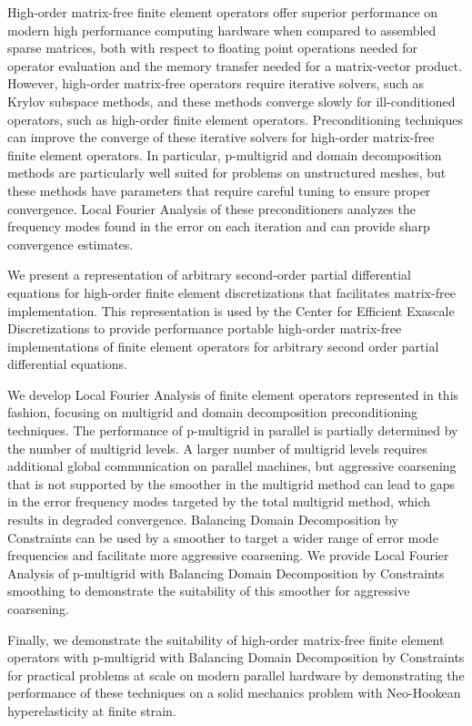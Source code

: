 High-order matrix-free finite element operators offer superior performance on modern high performance computing hardware when compared to assembled sparse matrices, both with respect to floating point operations needed for operator evaluation and the memory transfer needed for a matrix-vector product.
However, high-order matrix-free operators require iterative solvers, such as Krylov subspace methods, and these methods converge slowly for ill-conditioned operators, such as high-order finite element operators.
Preconditioning techniques can improve the converge of these iterative solvers for high-order matrix-free finite element operators.
In particular, p-multigrid and domain decomposition methods are particularly well suited for problems on unstructured meshes, but these methods have parameters that require careful tuning to ensure proper convergence.
Local Fourier Analysis of these preconditioners analyzes the frequency modes found in the error on each iteration and can provide sharp convergence estimates.

We present a representation of arbitrary second-order partial differential equations for high-order finite element discretizations that facilitates matrix-free implementation.
This representation is used by the Center for Efficient Exascale Discretizations to provide performance portable high-order matrix-free implementations of finite element operators for arbitrary second order partial differential equations.

We develop Local Fourier Analysis of finite element operators represented in this fashion, focusing on multigrid and domain decomposition preconditioning techniques.
The performance of p-multigrid in parallel is partially determined by the number of multigrid levels.
A larger number of multigrid levels requires additional global communication on parallel machines, but aggressive coarsening that is not supported by the smoother in the multigrid method can lead to gaps in the error frequency modes targeted by the total multigrid method, which results in degraded convergence.
Balancing Domain Decomposition by Constraints can be used by a smoother to target a wider range of error mode frequencies and facilitate more aggressive coarsening.
We provide Local Fourier Analysis of p-multigrid with Balancing Domain Decomposition by Constraints smoothing to demonstrate the suitability of this smoother for aggressive coarsening.

Finally, we demonstrate the suitability of high-order matrix-free finite element operators with p-multigrid with Balancing Domain Decomposition by Constraints for practical problems at scale on modern parallel hardware by demonstrating the performance of these techniques on a solid mechanics problem with Neo-Hookean hyperelasticity at finite strain.
